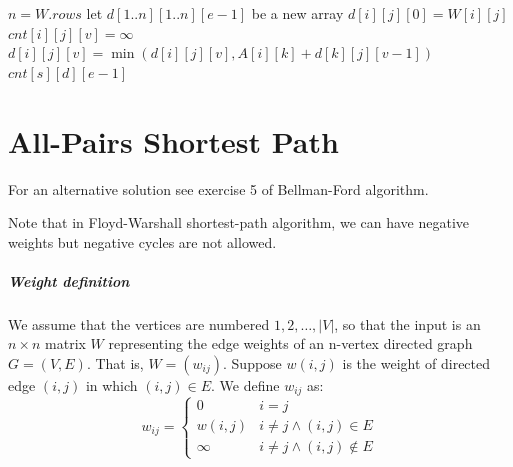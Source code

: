 \documentclass{book}
\begin{document}
\begin{enumerate}
\begin{enumerate}
\begin{itemize}
\begin{algorithm}[h!]
                        \begin{algorithmic}[1]
                            \State {}
                                \State $n = W.rows$
                                \State let $d[1..n][1..n][e - 1]$ be a new array
                                        \State $d[i][j][0] = W[i][j]$
                                    \EndFor
                                \EndFor
                                            \State $cnt[i][j][v] = \infty$
                                                    \State $d[i][j][v] = \min{(d[i][j][v], A[i][k] + d[k][j][v - 1])}$
                                                \EndIf
                                            \EndFor
                                        \EndFor
                                    \EndFor
                                \EndFor
                                \State \Return $cnt[s][d][e - 1]$
                            \EndFunction
                        \end{algorithmic}
                    \end{algorithm}
                \FloatBarrier					
					
				\end{itemize}
		\end{enumerate}
	\end{enumerate}
	
	\chapter{All-Pairs Shortest Path}
	For an alternative solution see exercise 5 of Bellman-Ford algorithm.
	\par Note that in Floyd-Warshall shortest-path algorithm, we can have negative weights but negative cycles are not allowed.
	\paragraph{Weight definition} We assume that the vertices are numbered $1, 2, \dots, |V|$, so that the input is an $n \times n$ matrix $W$ representing the edge weights of an n-vertex directed graph $G = (V, E)$. That is, $W = (w_{ij})$. Suppose $w(i, j)$ is the weight of directed edge $(i, j)$ in which $(i, j) \in E$. We define $w_{ij}$ as:
	\begin{equation*}
		w_{ij} = \begin{cases}
			0 & i = j \\
			w(i, j) & i \ne j \land (i, j) \in E \\
			\infty & i \ne j \land (i, j) \notin E
		\end{cases}
	\end{equation*}
\end{document}
